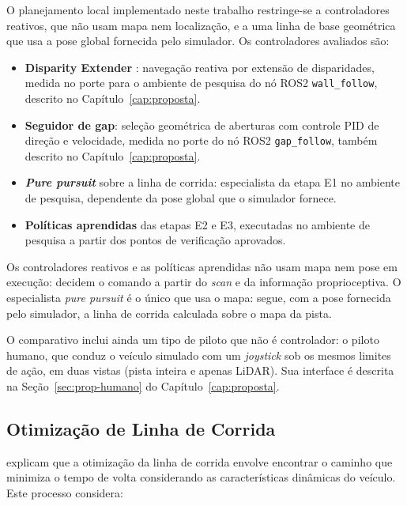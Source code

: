 O planejamento local implementado neste trabalho restringe-se a controladores
reativos, que não usam mapa nem localização, e a uma linha de base geométrica
que usa a pose global fornecida pelo simulador. Os controladores avaliados são:

\begin{itemize}
    \item \textbf{Disparity Extender} \cite{Otterness2019Disparity}:
          navegação reativa por extensão de disparidades, medida no porte para o
          ambiente de pesquisa do nó ROS2 \texttt{wall\_follow}, descrito no
          Capítulo~\ref{cap:proposta}.

    \item \textbf{Seguidor de gap}: seleção geométrica de aberturas com
          controle PID de direção e velocidade, medida no porte do nó ROS2
          \texttt{gap\_follow}, também descrito no Capítulo~\ref{cap:proposta}.

    \item \textbf{\textit{Pure pursuit}} sobre a linha de corrida: especialista
          da etapa E1 no ambiente de pesquisa, dependente da pose global que o
          simulador fornece.

    \item \textbf{Políticas aprendidas} das etapas E2 e E3, executadas no
          ambiente de pesquisa a partir dos pontos de verificação aprovados.
\end{itemize}

Os controladores reativos e as políticas aprendidas não usam mapa nem pose em
execução: decidem o comando a partir do \textit{scan} e da informação
proprioceptiva. O especialista \textit{pure pursuit} é o único que usa o mapa:
segue, com a pose fornecida pelo simulador, a linha de corrida calculada sobre o
mapa da pista.

O comparativo inclui ainda um tipo de piloto que não é controlador: o piloto
humano, que conduz o veículo simulado com um \textit{joystick} sob os mesmos
limites de ação, em duas vistas (pista inteira e apenas LiDAR). Sua interface é
descrita na Seção~\ref{sec:prop-humano} do Capítulo~\ref{cap:proposta}.

\subsection{Otimização de Linha de Corrida}

\cite{OKelly2020F1TENTH} explicam que a otimização da linha de corrida envolve encontrar o caminho que minimiza o tempo de volta considerando as características dinâmicas do veículo. Este processo considera:

